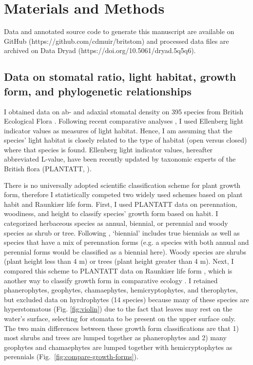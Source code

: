 \documentclass[12pt, oneside]{article}
\newcommand{\el}{L-value}
\begin{document}

\section*{Materials and Methods}

Data and annotated source code to generate this manuscript are available on GitHub (https://github.com/cdmuir/britstom) and processed data files are archived on Data Dryad (https://doi.org/10.5061/dryad.5q5q6).

\subsection*{Data on stomatal ratio, light habitat, growth form, and phylogenetic relationships}

I obtained data on ab- and adaxial stomatal density on 395 species from British Ecological Flora \citep{Salisbury_1927, Fitter_Peat_1994a, BEF}. Following recent comparative analyses \citep[e.g.][]{Niinemets_Valladares_2006, Bartelheimer_Poschlod_2016, Shipley_etal_2017}, I used Ellenberg light indicator values \citep{Ellenberg_1974} as measures of light habitat. Hence, I am assuming that the species' light habitat is closely related to the type of habitat (open versus closed) where that species is found. Ellenberg light indicator values, hereafter abbreviated \el, have been recently updated by taxonomic experts of the British flora (PLANTATT, \cite{Hill_etal_2004}). 

There is no universally adopted scientific classification scheme for plant growth form, therefore I statistically competed two widely used schemes based on plant habit and Raunki\ae r life form. First, I used PLANTATT data on perennation, woodiness, and height to classify species' growth form based on habit. I categorized herbaceous species as annual, biennial, or perennial and woody species as shrub or tree. Following \cite{Muir_2015}, `biennial' includes true biennials as well as species that have a mix of perennation forms (e.g. a species with both annual and perennial forms would be classified as a biennial here). Woody species are shrubs (plant height less than 4 m) or trees (plant height greater than 4 m). Next, I compared this scheme to PLANTATT data on Raunki\ae r life form \citep{Raunkiaer_1934}, which is another way to classify growth form in comparative ecology \citep[e.g.][]{Peat_Fitter_1994b, Salguero-Gomez_etal_2016}. I retained phanerophytes, geophytes, chamaephytes, hemicryptophytes, and therophytes, but excluded data on hyrdrophytes (14 species) because many of these species are hyperstomatous (Fig. \ref{fig:violin}) due to the fact that leaves may rest on the water's surface, selecting for stomata to be present on the upper surface only. The two main differences between these growth form classifications are that 1) most shrubs and trees are lumped together as phanerophytes and 2) many geophytes and chamaephytes are lumped together with hemicryptophytes as perennials (Fig.~\ref{fig:compare-growth-forms}). 
\end{document}
